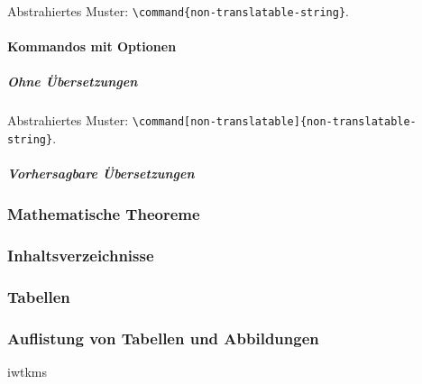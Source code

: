 Abstrahiertes Muster: \verb|\command{non-translatable-string}|.

\newpage

\paragraph{Kommandos mit Optionen}
\subparagraph{Ohne Übersetzungen} %

Abstrahiertes Muster: \verb|\command[non-translatable]{non-translatable-string}|.

\subparagraph{Vorhersagbare Übersetzungen} %


\subsubsection{Mathematische Theoreme}

\newpage



\newpage

\subsubsection{Inhaltsverzeichnisse}



\newpage

\subsubsection{Tabellen}

\newpage

\subsubsection{Auflistung von Tabellen und Abbildungen}
iwtkms
\newpage